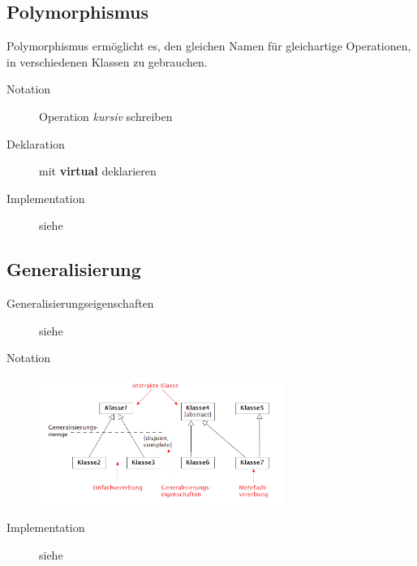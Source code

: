 \subsection{Polymorphismus }
  Polymorphismus ermöglicht es, den gleichen Namen für gleichartige Operationen,
  in verschiedenen Klassen zu gebrauchen.
  \begin{description}
    \item[]
    \item[Notation]
      Operation \textit{kursiv} schreiben
    \item[Deklaration]
      mit \textbf{virtual} deklarieren
    \item[Implementation]
      siehe 
  \end{description}
  
\subsection{Generalisierung }
  \begin{description}
    \item[Generalisierungseigenschaften]
      siehe 
    \item[Notation]
      \parbox{15cm}{\includegraphics[width=8cm]{./bilder/Notation_Generalisierung.png}}
    \item[Implementation]
      siehe 
  \end{description}
  

